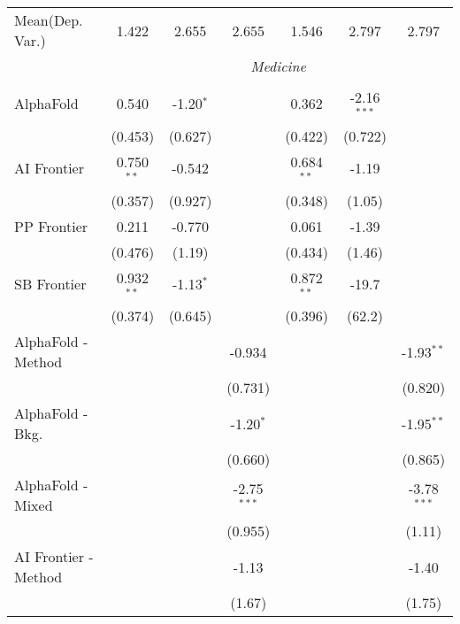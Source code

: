 \begin{tabular}{lcccccc}
Mean(Dep. Var.) & 1.422 & 2.655 & 2.655 & 1.546 & 2.797 & 2.797 \\
 & \multicolumn{6}{c}{\textit{Medicine}} \\ \\
   AlphaFold            & 0.540        & -1.20$^{*}$ &               & 0.362        & -2.16$^{***}$ &   \\   
                        & (0.453)      & (0.627)     &               & (0.422)      & (0.722)       &   \\   
   AI Frontier          & 0.750$^{**}$ & -0.542      &               & 0.684$^{**}$ & -1.19         &   \\   
                        & (0.357)      & (0.927)     &               & (0.348)      & (1.05)        &   \\   
   PP Frontier          & 0.211        & -0.770      &               & 0.061        & -1.39         &   \\   
                        & (0.476)      & (1.19)      &               & (0.434)      & (1.46)        &   \\   
   SB Frontier          & 0.932$^{**}$ & -1.13$^{*}$ &               & 0.872$^{**}$ & -19.7         &   \\   
                        & (0.374)      & (0.645)     &               & (0.396)      & (62.2)        &   \\   
   AlphaFold - Method   &              &             & -0.934        &              &               & -1.93$^{**}$\\   
                        &              &             & (0.731)       &              &               & (0.820)\\   
   AlphaFold - Bkg.     &              &             & -1.20$^{*}$   &              &               & -1.95$^{**}$\\   
                        &              &             & (0.660)       &              &               & (0.865)\\   
   AlphaFold - Mixed    &              &             & -2.75$^{***}$ &              &               & -3.78$^{***}$\\   
                        &              &             & (0.955)       &              &               & (1.11)\\   
   AI Frontier - Method &              &             & -1.13         &              &               & -1.40\\   
                        &              &             & (1.67)        &              &               & (1.75)\\   

\end{tabular}

